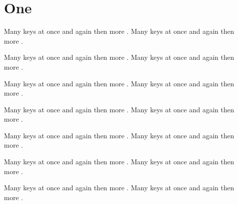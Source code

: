 \documentclass{article}
\begin{document}
\tableofcontents
\section{One}
Many keys \citep{a,b,c,d,e,f,g,h} at once \citep{a,b,c,d,e,f,g,h} and again \citep{a,b,c,d,e,f,g,h} then \citep{a,b,c,d,e,f,g,h} more \citep{a,b,c,d,e,f,g,h}. Many keys \citep{a,b,c,d,e,f,g,h} at once \citep{a,b,c,d,e,f,g,h} and again \citep{a,b,c,d,e,f,g,h} then \citep{a,b,c,d,e,f,g,h} more \citep{a,b,c,d,e,f,g,h}.

Many keys \citep{a,b,c,d,e,f,g,h} at once \citep{a,b,c,d,e,f,g,h} and again \citep{a,b,c,d,e,f,g,h} then \citep{a,b,c,d,e,f,g,h} more \citep{a,b,c,d,e,f,g,h}. Many keys \citep{a,b,c,d,e,f,g,h} at once \citep{a,b,c,d,e,f,g,h} and again \citep{a,b,c,d,e,f,g,h} then \citep{a,b,c,d,e,f,g,h} more \citep{a,b,c,d,e,f,g,h}.

Many keys \citep{a,b,c,d,e,f,g,h} at once \citep{a,b,c,d,e,f,g,h} and again \citep{a,b,c,d,e,f,g,h} then \citep{a,b,c,d,e,f,g,h} more \citep{a,b,c,d,e,f,g,h}. Many keys \citep{a,b,c,d,e,f,g,h} at once \citep{a,b,c,d,e,f,g,h} and again \citep{a,b,c,d,e,f,g,h} then \citep{a,b,c,d,e,f,g,h} more \citep{a,b,c,d,e,f,g,h}.

Many keys \citep{a,b,c,d,e,f,g,h} at once \citep{a,b,c,d,e,f,g,h} and again \citep{a,b,c,d,e,f,g,h} then \citep{a,b,c,d,e,f,g,h} more \citep{a,b,c,d,e,f,g,h}. Many keys \citep{a,b,c,d,e,f,g,h} at once \citep{a,b,c,d,e,f,g,h} and again \citep{a,b,c,d,e,f,g,h} then \citep{a,b,c,d,e,f,g,h} more \citep{a,b,c,d,e,f,g,h}.

Many keys \citep{a,b,c,d,e,f,g,h} at once \citep{a,b,c,d,e,f,g,h} and again \citep{a,b,c,d,e,f,g,h} then \citep{a,b,c,d,e,f,g,h} more \citep{a,b,c,d,e,f,g,h}. Many keys \citep{a,b,c,d,e,f,g,h} at once \citep{a,b,c,d,e,f,g,h} and again \citep{a,b,c,d,e,f,g,h} then \citep{a,b,c,d,e,f,g,h} more \citep{a,b,c,d,e,f,g,h}.

Many keys \citep{a,b,c,d,e,f,g,h} at once \citep{a,b,c,d,e,f,g,h} and again \citep{a,b,c,d,e,f,g,h} then \citep{a,b,c,d,e,f,g,h} more \citep{a,b,c,d,e,f,g,h}. Many keys \citep{a,b,c,d,e,f,g,h} at once \citep{a,b,c,d,e,f,g,h} and again \citep{a,b,c,d,e,f,g,h} then \citep{a,b,c,d,e,f,g,h} more \citep{a,b,c,d,e,f,g,h}.

Many keys \citep{a,b,c,d,e,f,g,h} at once \citep{a,b,c,d,e,f,g,h} and again \citep{a,b,c,d,e,f,g,h} then \citep{a,b,c,d,e,f,g,h} more \citep{a,b,c,d,e,f,g,h}. Many keys \citep{a,b,c,d,e,f,g,h} at once \citep{a,b,c,d,e,f,g,h} and again \citep{a,b,c,d,e,f,g,h} then \citep{a,b,c,d,e,f,g,h} more \citep{a,b,c,d,e,f,g,h}.
\end{document}
